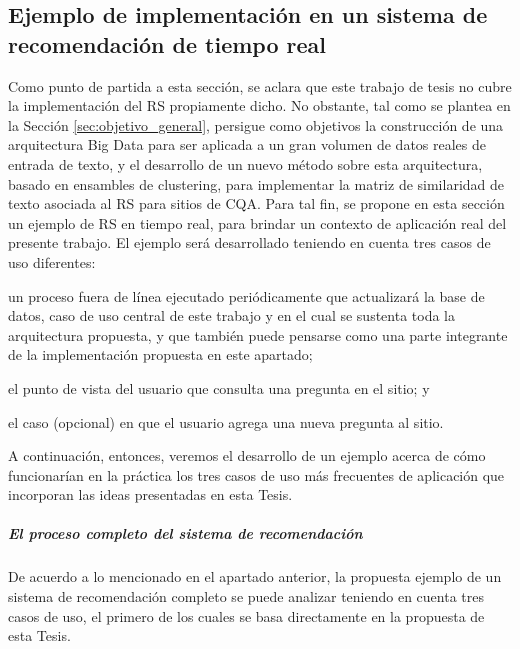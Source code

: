 \subsection{Ejemplo de implementación en un sistema de recomendación de tiempo real}

Como punto de partida a esta sección, se aclara que este trabajo de tesis no cubre la implementación del RS propiamente dicho. No obstante, tal como se plantea en la Sección \ref{sec:objetivo_general}, persigue como objetivos la construcción de una arquitectura Big Data para ser aplicada a un gran volumen de datos reales de entrada de texto, y el desarrollo de un nuevo método sobre esta arquitectura, basado en ensambles de clustering, para implementar la matriz de similaridad de texto asociada al RS para sitios de CQA. Para tal fin, se propone en esta sección un ejemplo de RS en tiempo real, para brindar un contexto de aplicación real del presente trabajo. El ejemplo será desarrollado teniendo en cuenta tres casos de uso diferentes: \begin{enumerate*} [label=(\roman*)] \item un proceso fuera de línea ejecutado periódicamente que actualizará la base de datos, caso de uso central de este trabajo y en el cual se sustenta toda la arquitectura propuesta, y que también puede pensarse como una parte integrante de la implementación propuesta en este apartado; \item el punto de vista del usuario que consulta una pregunta en el sitio; y \item el caso (opcional) en que el usuario agrega una nueva pregunta al sitio.\end{enumerate*}

\bigskip A continuación, entonces, veremos el desarrollo de un ejemplo acerca de cómo funcionarían en la práctica los tres casos de uso más frecuentes de aplicación que incorporan las ideas presentadas en esta Tesis.

\subparagraph{El proceso completo del sistema de recomendación}
De acuerdo a lo mencionado en el apartado anterior, la propuesta ejemplo de un sistema de recomendación completo se puede analizar teniendo en cuenta tres casos de uso, el primero de los cuales se basa directamente en la propuesta de esta Tesis.

